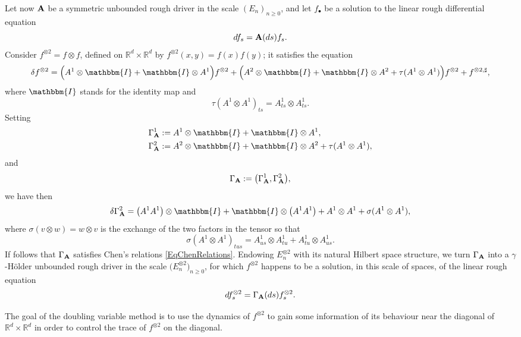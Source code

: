 \documentclass[11pt,a4paper]{amsart}
\newcommand{\RR}{\mathbb{R}}  \newcommand{\CC}{\mathbb{C}}  \newcommand{\LL}{\mathbb{L}}  \newcommand{\WW}{\mathbb{W}}
\renewcommand{\geq}{\geqslant}
\newcommand{\ssk}{\smallskip}
\numberwithin{equation}{section} %
\begin{document}
\bigskip 
 
Let now $\bf A$ be a symmetric unbounded rough driver in the scale $(E_n)_{n\geq 0}$, and let $f_\bullet$ be a solution to the linear rough differential equation 
$$ 
df_s = {\bf A}(ds)f_s.
$$
Consider $f^{\otimes 2} = f \otimes f$, defined on $\RR^d\times\RR^d$ by
$
f^{\otimes 2}(x,y) = f(x)f(y)
$; 
it satisfies the equation
$$ 
\delta f^{\otimes 2} = \Big( A^1  \otimes \mathbbm{I}+\mathbbm{I} \otimes A^1 \Big) f^{\otimes 2} + \Big(A^2 \otimes \mathbbm{I}+\mathbbm{I} \otimes A^2 + \tau (A^1 \otimes A^1)\Big) f^{\otimes 2} + f^{\otimes 2, \sharp},
$$
where $\mathbbm{I}$ stands for the identity map and
$$
\tau (A^1 \otimes A^1)_{t s} = A^1_{t s} \otimes A^1_{t s}.
$$
Setting 
\begin{equation*}
\begin{split}
&\Gamma_{\bfA}^1 := A^1  \otimes \mathbbm{I}+\mathbbm{I} \otimes A^1, \\
&\Gamma_{\bfA}^2 := A^2 \otimes \mathbbm{I}+\mathbbm{I} \otimes A^2 + \tau (A^1 \otimes A^1),
\end{split}
\end{equation*}
and 
$$
\Gamma_{\bf A} := \big(\Gamma_{\bf A}^1, \Gamma_{\bf A}^2\big), 
$$ 
we have then 
$$
\delta \Gamma_{\bfA}^2 = \big(A^1 A^1\big) \otimes \mathbbm{I}+\mathbbm{I} \otimes \big(A^1 A^1\big) + A^1 \otimes A^1 + \sigma (A^1 \otimes A^1),
$$ 
where $\sigma (v \otimes w) = w \otimes v$ is the exchange of the two factors in the tensor so that 
$$
\sigma (A^1 \otimes A^1)_{t u s} = A^1_{us} \otimes A^1_{tu} + A^1_{tu} \otimes A^1_{us}.
$$ 
If follows that $\Gamma_{\bf A}$ satisfies Chen's relations \eqref{EqChenRelations}. Endowing $E_n^{\otimes 2}$ with its natural Hilbert space structure, we turn $\Gamma_{\bf A}$ into a $\gamma$-H\"older unbounded rough driver in the scale $\big(E_n^{\otimes 2}\big)_{n \geq 0}$, for which $f^{\otimes 2}$ happens to be a solution, in this scale of spaces, of the linear rough equation
$$
df^{\otimes 2}_s = \Gamma_{\bf A}(ds)f^{\otimes 2}_s. 
$$

\ssk 

The goal of the doubling variable method is to use the dynamics of $f^{\otimes 2}$ to gain some information of its behaviour near the diagonal of $\RR^d \times \RR^d$ in order to control the trace of $f^{\otimes 2}$ on the diagonal. 
\end{document}
